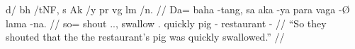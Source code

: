 \documentclass[
	12pt,
	varwidth,
	border=0.50001bp,
	convert,
]{standalone}
\begin{document}

\ex[everygla=\Tagati]
\begingl
    \gla d/  bh    /tNF,                s       Ak      /y          pr      vg           lm         /n. //
    \glb Da= baha  -tang,               sa      aka     -ya         para    vaga -Ø      lama       -na. //
    \glc so= shout \Tpl{}.\M{}.\Aarg{}, \PatT{} swallow \Tsg{}.\M{} quickly pig  -\Top{} restaurant -\Gen{} //
    \glft ``So they shouted that the the restaurant’s pig was quickly swallowed.'' //
\endgl
\xe

\end{document}
